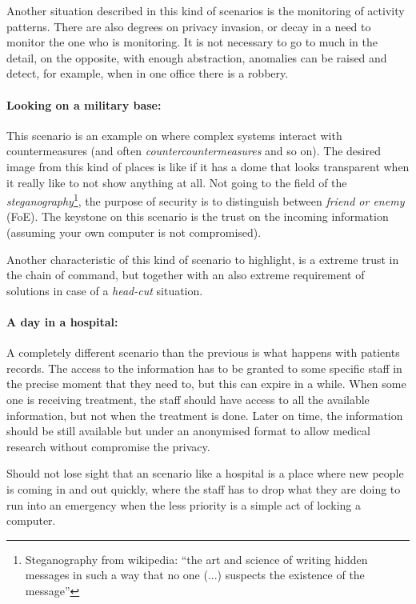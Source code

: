 \documentclass[10pt,a4paper,twoside]{llncs}
\begin{document}
Another situation described in this kind of scenarios is the monitoring of activity patterns. There are also degrees on privacy invasion, or decay in a need to monitor the one who is monitoring. It is not necessary to go to much in the detail, on the opposite, with enough abstraction, anomalies can be raised and detect, for example, when in one office there is a robbery.

\paragraph{Looking on a military base:} This scenario is an example on where complex systems interact with countermeasures (and often \emph{countercountermeasures} and so on). The desired image from this kind of places is like if it has a dome that looks transparent when it really like to not show anything at all. Not going to the field of the \emph{steganography}\footnote{Steganography from wikipedia: ``the art and science of writing hidden messages in such a way that no one (...) suspects the existence of the message''}, the purpose of security is to distinguish between \emph{friend or enemy} (FoE). The keystone on this scenario is the trust on the incoming information (assuming your own computer is not compromised).

Another characteristic of this kind of scenario to highlight, is a extreme trust in the chain of command, but together with an also extreme requirement of solutions in case of a \emph{head-cut} situation.

\paragraph{A day in a hospital:} A completely different scenario than the previous is what happens with patients records. The access to the information has to be granted to some specific staff in the precise moment that they need to, but this can expire in a while. When some one is receiving treatment, the staff should have access to all the available information, but not when the treatment is done. Later on time, the information should be still available but under an anonymised format to allow medical research without compromise the privacy.

Should not lose sight that an scenario like a hospital is a place where new people is coming in and out quickly, where the staff has to drop what they are doing to run into an emergency when the less priority is a simple act of locking a computer.
\end{document}
